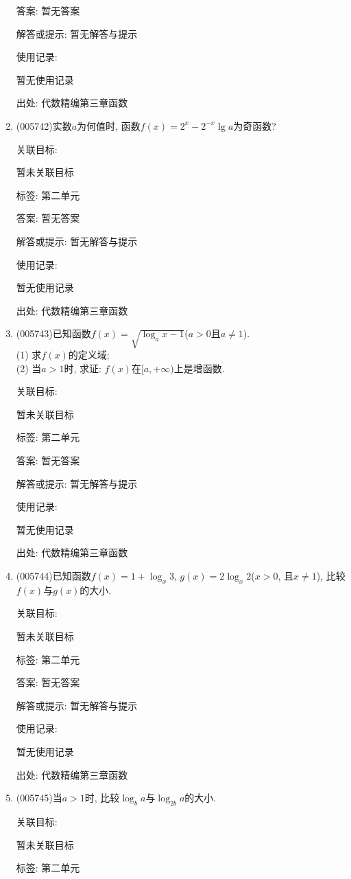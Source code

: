 \documentclass[10pt,a4paper]{article}
\begin{document}
\begin{enumerate}[1.]
答案: 暂无答案

解答或提示: 暂无解答与提示

使用记录:

暂无使用记录


出处: 代数精编第三章函数
\item { (005742)}实数$a$为何值时, 函数$f(x)=2^x-2^{-x}\lg a$为奇函数?


关联目标:

暂未关联目标



标签: 第二单元

答案: 暂无答案

解答或提示: 暂无解答与提示

使用记录:

暂无使用记录


出处: 代数精编第三章函数
\item { (005743)}已知函数$f(x)=\sqrt {\log_ax-1}$($a>0$且$a\ne 1$).\\
(1) 求$f(x)$的定义域;\\
(2) 当$a>1$时, 求证: $f(x)$在$[a,+\infty)$上是增函数.


关联目标:

暂未关联目标



标签: 第二单元

答案: 暂无答案

解答或提示: 暂无解答与提示

使用记录:

暂无使用记录


出处: 代数精编第三章函数
\item { (005744)}已知函数$f(x)=1+\log_x3$, $g(x)=2\log_x2$($x>0$, 且$x\ne 1$), 比较$f(x)$与$g(x)$的大小.


关联目标:

暂未关联目标



标签: 第二单元

答案: 暂无答案

解答或提示: 暂无解答与提示

使用记录:

暂无使用记录


出处: 代数精编第三章函数
\item { (005745)}当$a>1$时, 比较$\log_ba$与$\log_{2b}a$的大小.


关联目标:

暂未关联目标



标签: 第二单元


\end{enumerate}
\end{document}
